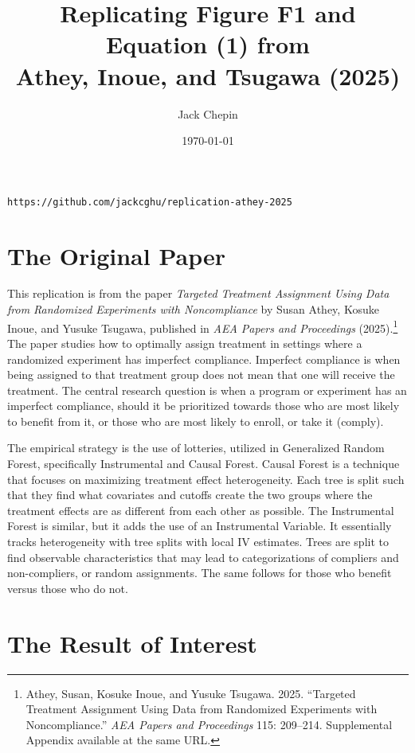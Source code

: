 \documentclass[12pt]{article}
\title{Replicating Figure F1 and Equation (1) from\\
Athey, Inoue, and Tsugawa (2025)}
\author{Jack Chepin}
\date{\today}
\begin{document}
\maketitle

\begin{center}
\texttt{https://github.com/jackcghu/replication-athey-2025}
\end{center}

\section{The Original Paper}

This replication is from the paper \textit{Targeted Treatment Assignment Using Data from
Randomized Experiments with Noncompliance} by Susan Athey, Kosuke Inoue, and
Yusuke Tsugawa, published in \textit{AEA Papers and Proceedings} (2025).\footnote{Athey, Susan, Kosuke Inoue, and Yusuke Tsugawa. 2025. ``Targeted Treatment Assignment Using Data from Randomized Experiments with Noncompliance.'' \textit{AEA Papers and Proceedings} 115: 209--214. Supplemental Appendix available at the same URL.} The
paper studies how to optimally assign treatment in settings where a randomized
experiment has imperfect compliance. Imperfect compliance is when being assigned to that treatment group does not mean that one will receive the treatment. The central research question is when a program or experiment has an imperfect compliance, should it be prioritized towards those who are most likely to benefit from it, or those who are most likely to enroll, or take it (comply).

The empirical strategy is the use of lotteries, utilized in Generalized Random Forest, specifically Instrumental and Causal Forest. Causal Forest is a technique that focuses on maximizing treatment effect heterogeneity. Each tree is split such that they find what covariates and cutoffs create the two groups where the treatment effects are as different from each other as possible. The Instrumental Forest is similar, but it adds the use of an Instrumental Variable. It essentially tracks heterogeneity with tree splits with local IV estimates. Trees are split to find observable characteristics that may lead to categorizations of compliers and non-compliers, or random assignments. The same follows for those who benefit versus those who do not.


\section{The Result of Interest}
\end{document}
